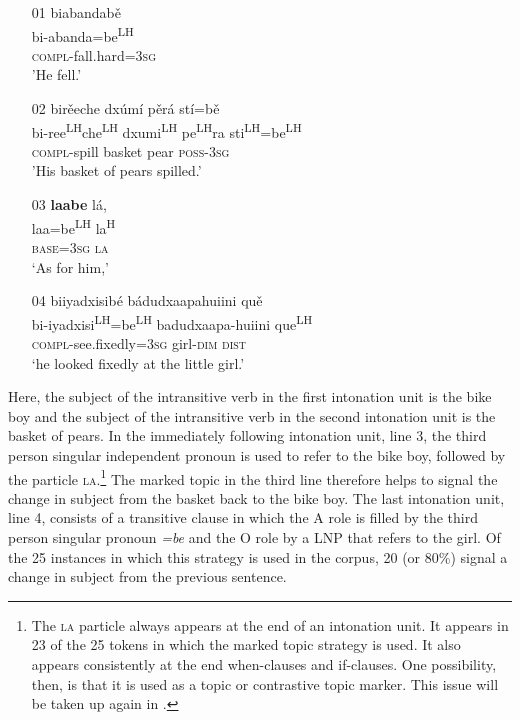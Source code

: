 \ea\label{markedIPR1}
\begin{itemize}
\item[01]
\glll biabandab\v{e} \\
bi-abanda=be\textsuperscript{LH} \\
\textsc{compl}-fall.hard=3\textsc{sg} \\
\glt 'He fell.'


\item[02]
\glll bir\v{e}eche dx\'{u}m\'{i} p\v{e}r\'{a} st\'{i}=b\v{e} \\
bi-ree\textsuperscript{LH}che\textsuperscript{LH} dxumi\textsuperscript{LH} pe\textsuperscript{LH}ra sti\textsuperscript{LH}=be\textsuperscript{LH} \\
\textsc{compl}-spill basket pear \textsc{poss}-3\textsc{sg} \\
\glt 'His basket of pears spilled.'


\item[03]
\glll \textbf{laabe} l\'{a}, \\
laa=be\textsuperscript{LH} la\textsuperscript{H} \\
\textsc{base}=3\textsc{sg} \textsc{la} \\
\glt `As for him,'


\item[04]
\glll biiyadxisib\'{e} b\'{a}dudxaapahuiini qu\v{e} \\
bi-iyadxisi\textsuperscript{LH}=be\textsuperscript{LH} badudxaapa-huiini que\textsuperscript{LH} \\
\textsc{compl}-see.fixedly=3\textsc{sg} girl-\textsc{dim} \textsc{dist} \\
\glt `he looked fixedly at the little girl.'
\end{itemize}
\z
Here, the subject of the intransitive verb in the first intonation unit is the bike boy and the subject of the intransitive verb in the second intonation unit is the basket of pears. In the immediately following intonation unit, line 3, the third person singular independent pronoun is used to refer to the bike boy, followed by the particle \textsc{la}.\footnote{The \textsc{la} particle always appears at the end of an intonation unit. It appears in 23 of the 25 tokens in which the marked topic strategy is used. It also appears consistently at the end when-clauses and if-clauses. One possibility, then, is that it is used as a topic or contrastive topic marker. This issue will be taken up again in .} The marked topic in the third line therefore helps to signal the change in subject from the basket back to the bike boy. The last intonation unit, line 4, consists of a transitive clause in which the A role is filled by the third person singular pronoun \textit{=be} and the O role by a LNP that refers to the girl. Of the 25 instances in which this strategy is used in the corpus, 20 (or 80{\%}) signal a change in subject from the previous sentence. 


